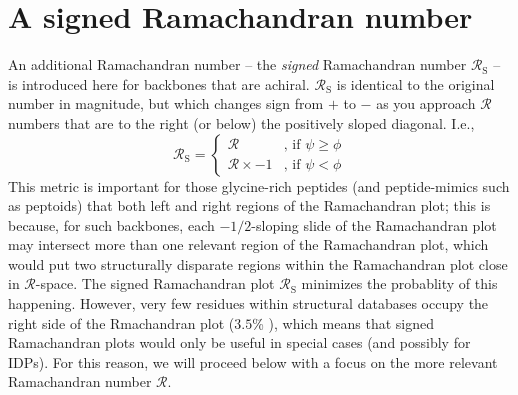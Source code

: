 \documentclass[fleqn,10pt,lineno]{wlpeerj} %
\begin{document}
\section{A signed Ramachandran number}
An additional Ramachandran number -- the \textit{signed} Ramachandran number $\mathcal{R}_\textrm{S}$ -- is introduced here for backbones that are achiral. $\mathcal{R}_\textrm{S}$ is identical to the original number in magnitude, but which changes sign from $+$ to $-$ as you approach $\mathcal{R}$ numbers that are to the right (or below) the positively sloped diagonal. I.e., 
\begin{equation}
\mathcal{R}_\textrm{S} = 
\begin{cases}
    \mathcal{R}         &\text{, if } \psi \geq \phi  \\
    \mathcal{R}\times-1 &\text{, if } \psi   <  \phi
\end{cases}\label{eqn:signed}
\end{equation}
This metric is important for those glycine-rich peptides (and peptide-mimics such as peptoids) that both left and right regions of the Ramachandran plot; this is because, for such backbones, each $-1/2$-sloping slide of the Ramachandran plot may intersect more than one relevant region of the Ramachandran plot, which would put two structurally disparate regions within the Ramachandran plot close in $\mathcal{R}$-space. The signed Ramachandran plot $\mathcal{R}_\textrm{S}$ minimizes the probablity of this happening. However, very few residues within structural databases occupy the right side of the Rmachandran plot ($3.5$\% ), which means that signed Ramachandran plots would only be useful in  special cases (and possibly for IDPs). For this reason, we will proceed below with a focus on the more relevant Ramachandran number $\mathcal{R}$.


\end{document}
